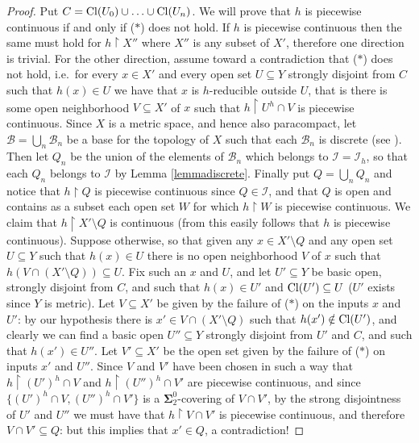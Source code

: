 \documentclass{rae}
\def\Cl{{\rm Cl}}
\newcommand{\B}{\mathcal{B}}
\newcommand{\I}{\mathcal{I}}
\newcommand{\bSigma}{\mathbf{\Sigma}}
\newcommand{\restr}[2]{#1 \restriction #2}
\theoremstyle{definition}
\begin{document}
\begin{proof}
Put $C = \Cl(U_0) \cup \dotsc \cup \Cl(U_n)$.
We will prove that $h$ is piecewise continuous if and only if ($*$)
does not hold. If $h$ is piecewise continuous then the same must hold
for $\restr{h}{X''}$  
where $X''$ is any subset of $X'$, therefore one direction is trivial. For 
the other direction, assume toward a contradiction that ($*$) does not 
hold, i.e.\ for every $x \in X'$ and every open set $U \subseteq Y$ 
strongly disjoint from $C$ such that $h(x) \in U$ we have that $x$
is $h$-reducible outside $U$, that is there is some open 
neighborhood $V \subseteq X'$ of $x$ such that $\restr{h}{U^h \cap V}$ 
is piecewise continuous. Since $X$ is a metric space, and hence also paracompact, 
let $\B = \bigcup_n \B_n$ be a base for the topology of $X$ such that each $\B_n$ is
discrete (see \cite{engelkind}). Then let $Q_n$ be the union of the elements of $\B_n$ which belongs to $\I = \I_h$, so that each $Q_n$ belongs to $\I$ by Lemma \ref{lemmadiscrete}. Finally put $Q = \bigcup_n Q_n$ and notice that $\restr{h}{Q}$ is piecewise continuous since $Q \in \I$, and that $Q$ is open and contains as a subset each open set $W$ for which $\restr{h}{W}$ is piecewise continuous.
We claim that $\restr{h}{X' \setminus Q}$ is continuous (from this
easily follows that $h$ is piecewise continuous). Suppose otherwise, so that given 
any $x \in X' \setminus Q$ and any open set $U \subseteq Y$ such 
that $h(x) \in U$ there is no open neighborhood
$V$ of $x$ such that $h(V \cap (X' \setminus Q)) \subseteq U$.
Fix such an $x$ and $U$, and let $U'\subseteq Y$ be basic open, strongly disjoint from $C$, and such 
that $h(x) \in U'$ and $\Cl(U') \subseteq U$ ($U'$ exists since $Y$ is metric). Let $V 
\subseteq X'$ be given by the failure of ($*$) on the inputs $x$ and
$U'$: by our hypothesis there is
$x' 
\in V \cap (X' \setminus Q)$ such that $h(x') \notin \Cl(U')$, and clearly we can find a basic open
 $U'' \subseteq Y$  strongly 
disjoint from $U'$ and $C$, and such that $h(x') \in U''$. Let $V' 
\subseteq X'$ be the open set given by the failure of ($*$) on inputs $x'$ 
and $U''$. Since $V$ and $V'$ have been chosen in such a way that 
$\restr{h}{(U')^h \cap V}$ and $\restr{h}{(U'')^h \cap V'}$ are piecewise continuous,
and since $\{(U')^h \cap V,(U'')^h \cap V'\}$ is a $\bSigma^0_2$-covering
of $V \cap V'$, by the strong disjointness of $U'$ and $U''$ we must have that 
$\restr{h}{V \cap V'}$ is piecewise continuous,
 and therefore $V \cap V' \subseteq Q$: 
but this implies that $x' \in Q$, a contradiction! 
\end{proof}
\end{document}

